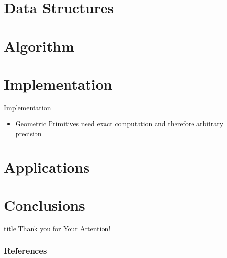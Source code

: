 \documentclass[aspectratio=169]{beamer}
\begin{document}
\section{Data Structures}

\section{Algorithm}

\section{Implementation}
\begin{frame}{Implementation}
  \begin{itemize}
    \item Geometric Primitives need exact computation and therefore arbitrary precision
  \end{itemize}
\end{frame}

\section{Applications}

\section{Conclusions}

\begin{frame}
  \vfill
  \centering
  \begin{beamercolorbox}[sep=8pt,center,shadow=true,rounded=true]{title}
    Thank you for Your Attention!%
    \par%
  \end{beamercolorbox}
  \vfill
\end{frame}

\begin{frame}
  \frametitle{References}
  \AtNextBibliography{\tiny}
  \begin{multicols}{2}
    \nocite{*}
    \printbibliography
  \end{multicols}
\end{frame}
\end{document}
